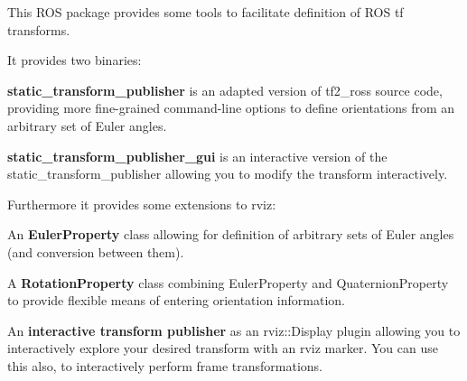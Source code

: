 This R\+OS package provides some tools to facilitate definition of R\+OS tf transforms.

It provides two binaries\+:


\begin{DoxyItemize}
\item {\bfseries{static\+\_\+transform\+\_\+publisher}} is an adapted version of {\ttfamily tf2\+\_\+ros}\textquotesingle{}s source code, providing more fine-\/grained command-\/line options to define orientations from an arbitrary set of Euler angles.
\item {\bfseries{static\+\_\+transform\+\_\+publisher\+\_\+gui}} is an interactive version of the {\ttfamily static\+\_\+transform\+\_\+publisher} allowing you to modify the transform interactively.
\end{DoxyItemize}

Furthermore it provides some extensions to rviz\+:


\begin{DoxyItemize}
\item An {\bfseries{Euler\+Property}} class allowing for definition of arbitrary sets of Euler angles (and conversion between them).
\item A {\bfseries{Rotation\+Property}} class combining {\ttfamily Euler\+Property} and {\ttfamily Quaternion\+Property} to provide flexible means of entering orientation information.
\item An {\bfseries{interactive transform publisher}} as an {\ttfamily rviz\+::\+Display} plugin allowing you to interactively explore your desired transform with an rviz marker. You can use this also, to interactively perform frame transformations. 
\end{DoxyItemize}